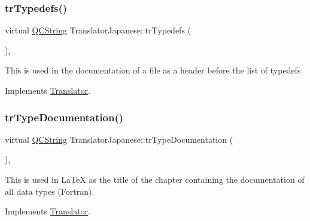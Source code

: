 \mbox{\label{class_translator_japanese_aeb8c46bfa311a65b58940f42f345a33f}} 
\subsubsection{\texorpdfstring{trTypedefs()}{trTypedefs()}}
{\footnotesize\ttfamily virtual \mbox{\hyperlink{class_q_c_string}{Q\+C\+String}} Translator\+Japanese\+::tr\+Typedefs (\begin{DoxyParamCaption}{ }\end{DoxyParamCaption})\hspace{0.3cm}{\ttfamily [inline]}, {\ttfamily [virtual]}}

This is used in the documentation of a file as a header before the list of typedefs 

Implements \mbox{\hyperlink{class_translator}{Translator}}.

\mbox{\label{class_translator_japanese_acb201d57d0c010243e24e1262ddd6271}} 
\subsubsection{\texorpdfstring{trTypeDocumentation()}{trTypeDocumentation()}}
{\footnotesize\ttfamily virtual \mbox{\hyperlink{class_q_c_string}{Q\+C\+String}} Translator\+Japanese\+::tr\+Type\+Documentation (\begin{DoxyParamCaption}{ }\end{DoxyParamCaption})\hspace{0.3cm}{\ttfamily [inline]}, {\ttfamily [virtual]}}

This is used in La\+TeX as the title of the chapter containing the documentation of all data types (Fortran). 

Implements \mbox{\hyperlink{class_translator}{Translator}}.

\mbox{\label{class_translator_japanese_a9f9101c6fe90d2148be17dbbaa683db1}} 
